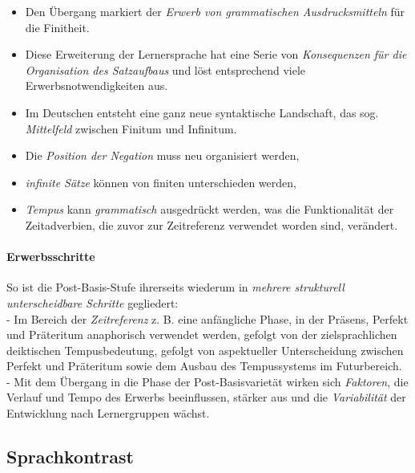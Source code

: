 \documentclass[
  letterpaper,
]{scrbook}
\let\oldparagraph\paragraph
\renewcommand{\paragraph}[1]{\oldparagraph{#1}\mbox{}}
\providecommand{\tightlist}{%
  \setlength{\itemsep}{0pt}\setlength{\parskip}{0pt}}\usepackage{longtable,booktabs,array}
\begin{document}
\begin{itemize}
\tightlist
\item
  Den Übergang markiert der \emph{Erwerb von grammatischen
  Ausdrucksmitteln} für die Finitheit.\\
\item
  Diese Erweiterung der Lernersprache hat eine Serie von
  \emph{Konsequenzen für die Organisation des Satzaufbaus} und löst
  entsprechend viele Erwerbsnotwendigkeiten aus.\\
\item
  Im Deutschen entsteht eine ganz neue syntaktische Landschaft, das sog.
  \emph{Mittelfeld} zwischen Finitum und Infinitum.\\
\item
  Die \emph{Position der Negation} muss neu organisiert werden,\\
\item
  \emph{infinite Sätze} können von finiten unterschieden werden,\\
\item
  \emph{Tempus} kann \emph{grammatisch} ausgedrückt werden, was die
  Funktionalität der Zeitadverbien, die zuvor zur Zeitreferenz verwendet
  worden sind, verändert.
\end{itemize}

\hypertarget{erwerbsschritte}{%
\paragraph{Erwerbsschritte}\label{erwerbsschritte}}

So ist die Post-Basis-Stufe ihrerseits wiederum in \emph{mehrere
strukturell unterscheidbare Schritte} gegliedert:\\
- Im Bereich der \emph{Zeitreferenz} z. B. eine anfängliche Phase, in
der Präsens, Perfekt und Präteritum anaphorisch verwendet werden,
gefolgt von der zielsprachlichen deiktischen Tempusbedeutung, gefolgt
von aspektueller Unterscheidung zwischen Perfekt und Präteritum sowie
dem Ausbau des Tempussystems im Futurbereich.\\
- Mit dem Übergang in die Phase der Post-Basisvarietät wirken sich
\emph{Faktoren}, die Verlauf und Tempo des Erwerbs beeinflussen, stärker
aus und die \emph{Variabilität} der Entwicklung nach Lernergruppen
wächst.

\hypertarget{sprachkontrast}{%
\subsection{Sprachkontrast}\label{sprachkontrast}}
\end{document}
